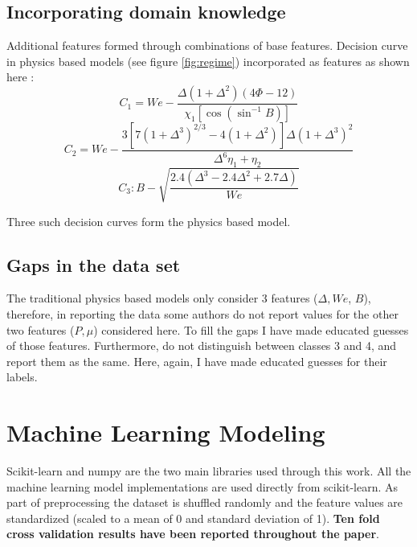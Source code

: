 \documentclass{article}
\begin{document}
\subsection{Incorporating domain knowledge}
Additional features formed through combinations of base features.
Decision curve in physics based models \cite{munnannur2007new} (see figure \ref{fig:regime}) incorporated as features as shown here :
\begin{equation}
\label{eq:c1}
 C_1 = We - \frac{\Delta(1+\Delta^2)(4\Phi - 12)}{\chi_1\left[ \cos\left( \sin^{-1}B\right) \right]}
\end{equation}
\begin{equation}
\label{eq:c2}
 C_2 = We - \frac{3[7(1+\Delta^3)^{2/3} - 4(1+\Delta^2)]\Delta(1+\Delta^3)^2}{\Delta^6 \eta_1 + \eta_2}
\end{equation}
\begin{equation}
\label{eq:c3}
C_3: B - \sqrt{\frac{2.4(\Delta^3- 2.4 \Delta^2 + 2.7\Delta)}{We}}
\end{equation}

Three such decision curves form the physics based model.

\subsection{Gaps in the data set}
The traditional physics based models only consider 3 features ($\Delta, We$, $B$), therefore, in reporting the data some authors do not report values for the other two features ($P, \mu$) considered here. To fill the gaps I have made educated guesses of those features. Furthermore, \citet{qian1997regimes} do not distinguish between classes 3 and 4, and report them as the same. Here, again, I have made educated guesses for their labels.

\section{Machine Learning Modeling}
Scikit-learn \cite{scikit_learn} and numpy are the two main libraries used through this work. All the machine learning model implementations are used directly from scikit-learn. As part of preprocessing the dataset is shuffled randomly and the feature values are standardized (scaled  to a mean of 0 and standard deviation of 1). \textbf{Ten fold cross validation results have been reported throughout the paper}.

\end{document}
